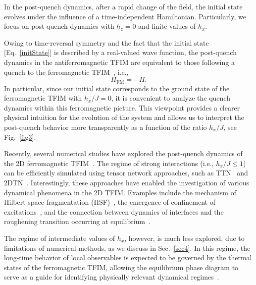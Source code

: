 \documentclass[aps,pra,reprint,amssymb,superscriptaddress]{revtex4-2}
\begin{document}
In the post-quench dynamics, after a rapid change of the field, the initial state evolves under the influence of a time-independent Hamiltonian. Particularly, we focus on post-quench dynamics with $h_{z} = 0$ and finite values of $h_{x}$. 

Owing to time-reversal symmetry and the fact that the initial state [Eq.~\eqref{initState}] is described by a real-valued wave function, the post-quench dynamics in the antiferromagnetic TFIM are equivalent to those following a quench to the ferromagnetic TFIM~\cite{frerot_multi-speed_2018}, i.e.,
\begin{equation}
    H_\text{FM} = -H.
\end{equation}
In particular, since our initial state corresponds to the ground state of the ferromagnetic TFIM with $h_x/J = 0$, it is convenient to analyze the quench dynamics within this ferromagnetic picture. This viewpoint provides a clearer physical intuition for the evolution of the system and allows us to interpret the post-quench behavior more transparently as a function of the ratio $h_x / J$, see Fig.~\ref{fig3}.

Recently, several numerical studies have explored the post-quench dynamics of the 2D ferromagnetic TFIM~\cite{khasseh_discrete_2020,balducci_localization_2022,tindall_confinement_2024,pavesic_constrained_2025,krinitsin_roughening_2025,krinitsin_time_2025}. 
The regime of strong interactions (i.e., $h_x/J \leq 1$) can be efficiently simulated using tensor network approaches, such as TTN~\cite{pavesic_constrained_2025,krinitsin_roughening_2025,krinitsin_time_2025} and 2DTN~\cite{tindall_confinement_2024}. 
 Interestingly, these approaches have enabled the investigation of various dynamical phenomena in the 2D TFIM. 
Examples include the mechanism of Hilbert space fragmentation (HSF)~\cite{yoshinaga_emergence_2022,hart_hilbert_2022}, the emergence of confinement of excitations~\cite{balducci_localization_2022,tindall_confinement_2024,pavesic_constrained_2025}, and the connection between dynamics of interfaces and the roughening transition occurring at equilibrium~\cite{krinitsin_roughening_2025,krinitsin_time_2025}.

The regime of intermediate values of $h_x$, however, is much less explored, due to limitations of numerical methods, as we discuss in Sec.~\ref{sec4}.
In this regime, the long-time behavior of local observables is expected to be governed by the thermal states of the ferromagnetic TFIM, allowing the equilibrium phase diagram to serve as a guide for identifying physically relevant dynamical regimes~\cite{mondaini_eigenstate_2016, mondaini_eigenstate_2017}. 
\end{document}
